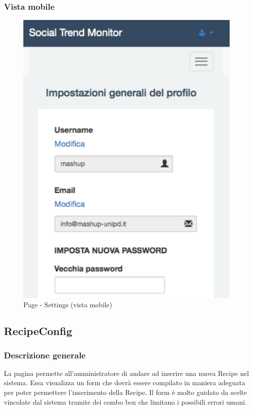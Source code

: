		\subsubsection{Vista mobile} %
		\begin{figure}[htbp]
			\centering
			\centerline{\includegraphics[scale=0.5]{./images/mockup/settings_vm.pdf}}
			\caption{Page - Settings (vista mobile)}
		\end{figure}

	\subsection{RecipeConfig} %
	\label{sub:recipeconfig}
		\subsubsection{Descrizione generale} %
		La pagina permette all'amministratore di andare ad inserire una nuova Recipe nel sistema. Essa visualizza un form che dovrà essere compilato in maniera adeguata per poter permettere l'inserimento della Recipe. Il form è molto guidato da scelte vincolate dal sistema tramite dei combo box che limitano i possibili errori umani. 

